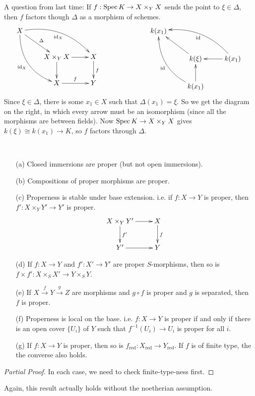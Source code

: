  \setcounter{lecture}{9}

A question from last time: If $f:\text{\rm Spec\,} K\to X\times_Y X$ sends the
point to $\xi \in \Delta$, then $f$ factors though $\Delta$ as a
morphism of schemes.
\[\xymatrix{
 X\ar@/_4ex/[ddr]_{\text{id}_X}\ar@{->}[dr]^{\Delta}
 \ar@/^4ex/[drr]_{\text{id}_X} \\
 & X\times_Y X \ar[r] \ar[d] & X\ar[d]^f\\
 & X\ar[r]^f & Y
}\hspace{2.4cm}\xymatrix{
 k(x_1)\ar@{<-}@/_4ex/[ddr]_{\text{id}}\ar@{<-}[dr]
 \ar@{<-}@/^4ex/[drr]_{\text{id}} \\
 & k(\xi) \ar@{<-}[r] \ar@{<-}[d] & k(x_1)\\
 & k(x_1)
}\] Since $\xi \in \Delta$, there is some $x_1\in X$ such that
$\Delta(x_1)=\xi$.  So we get the diagram on the right, in which
every arrow must be an isomorphism (since all the morphisms are
between fields).  Now $\text{\rm Spec\,} K \to X\times_Y X$ gives $k(\xi)\cong
k(x_1)\to K$, so $f$ factors through $\Delta$.

\begin{corollary}\
\begin{itemize}
 \item[(a)] Closed immersions are proper (but not open immersions).
 \item[(b)] Compositions of proper morphisms are proper.
 \item[(c)] Properness is stable under base extension. i.e.  if
 $f:X\to Y$ is proper, then $f':X\times_Y Y' \to Y'$ is
 proper.
 \[\xymatrix{
 X\times_Y Y' \ar[r] \ar[d]^{f'} & X\ar[d]^f\\
 Y' \ar[r] & Y
}\]
 \item[(d)] If $f:X\to Y$ and $f':X'\to Y'$ are proper
 $S$-morphisms, then so is $f\times f':X\times_S X' \to Y\times_S
 Y$.
 \item[(e)] If $X\xrightarrow{f} Y \xrightarrow{g} Z$ are
 morphisms and $g\circ f$ is proper and $g$ is separated, then $f$ is proper.
 \item[(f)] Properness is local on the base.  i.e. $f:X\to Y$
 is proper if and only if there is an open cover $\{U_i\}$ of
 $Y$ such that $f^{-1}(U_i)\to U_i$ is proper for all $i$.
 \item[(g)] If $f:X\to Y$ is proper, then so is
 $f_{\text{red}}:X_{\text{red}}\to Y_{\text{red}}$.  If $f$ is of
 finite type, the the converse also holds.
\end{itemize}
\end{corollary}
\begin{proof}[Partial Proof]
 In each case, we need to check finite-type-ness first.
\end{proof}
Again, this result actually holds without the noetherian
assumption.

